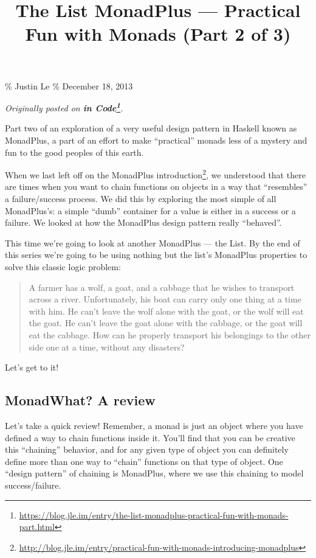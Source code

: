 \documentclass[]{article}
\title{The List MonadPlus --- Practical Fun with Monads (Part 2 of 3)}
\renewcommand{\href}[2]{#2\footnote{\url{#1}}}
\begin{document}
\maketitle

\% Justin Le \% December 18, 2013

\emph{Originally posted on
\textbf{\href{https://blog.jle.im/entry/the-list-monadplus-practical-fun-with-monads-part.html}{in
Code}}.}

Part two of an exploration of a very useful design pattern in Haskell known as
MonadPlus, a part of an effort to make ``practical'' monads less of a mystery
and fun to the good peoples of this earth.

When we last left off on the
\href{http://blog.jle.im/entry/practical-fun-with-monads-introducing-monadplus}{MonadPlus
introduction}, we understood that there are times when you want to chain
functions on objects in a way that ``resembles'' a failure/success process. We
did this by exploring the most simple of all MonadPlus's: a simple ``dumb''
container for a value is either in a success or a failure. We looked at how the
MonadPlus design pattern really ``behaved''.

This time we're going to look at another MonadPlus --- the List. By the end of
this series we're going to be using nothing but the list's MonadPlus properties
to solve this classic logic problem:

\begin{quote}
A farmer has a wolf, a goat, and a cabbage that he wishes to transport across a
river. Unfortunately, his boat can carry only one thing at a time with him. He
can't leave the wolf alone with the goat, or the wolf will eat the goat. He
can't leave the goat alone with the cabbage, or the goat will eat the cabbage.
How can he properly transport his belongings to the other side one at a time,
without any disasters?
\end{quote}

Let's get to it!

\subsection{MonadWhat? A review}\label{monadwhat-a-review}

Let's take a quick review! Remember, a monad is just an object where you have
defined a way to chain functions inside it. You'll find that you can be creative
this ``chaining'' behavior, and for any given type of object you can definitely
define more than one way to ``chain'' functions on that type of object. One
``design pattern'' of chaining is MonadPlus, where we use this chaining to model
success/failure.
\end{document}
